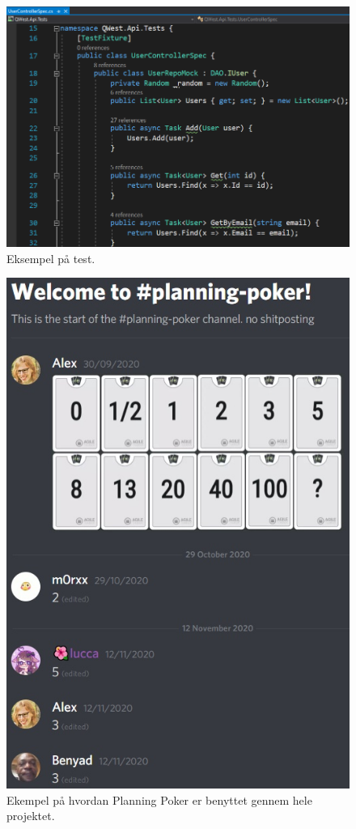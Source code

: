 \begin{figure}
    \includegraphics[width=\linewidth]{figures/tests.png}
    \caption{Eksempel på test.}
    \label{fig:Test}
\end{figure}


\begin{figure}
    \includegraphics[width=\linewidth]{figures/planningpoker.jpg}
    \caption{Ekempel på hvordan Planning Poker er benyttet gennem hele projektet.}
    \label{fig:Poker}
\end{figure}